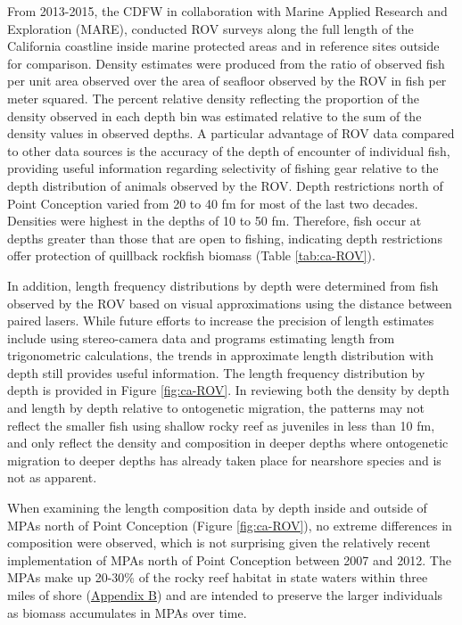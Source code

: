 \documentclass[11pt,
  english,
  a4paper,
]{article}
\begin{document}
From 2013-2015, the CDFW in collaboration with Marine Applied Research and Exploration (MARE), conducted ROV surveys along the full length of the California coastline inside marine protected areas and in reference sites outside for comparison. Density estimates were produced from the ratio of observed fish per unit area observed over the area of seafloor observed by the ROV in fish per meter squared. The percent relative density reflecting the proportion of the density observed in each depth bin was estimated relative to the sum of the density values in observed depths. A particular advantage of ROV data compared to other data sources is the accuracy of the depth of encounter of individual fish, providing useful information regarding selectivity of fishing gear relative to the depth distribution of animals observed by the ROV. Depth restrictions north of Point Conception varied from 20 to 40 fm for most of the last two decades. Densities were highest in the depths of 10 to 50 fm. Therefore, fish occur at depths greater than those that are open to fishing, indicating depth restrictions offer protection of quillback rockfish biomass (Table \ref{tab:ca-ROV}).

\leavevmode\tagmcend\tagstructend\par


In addition, length frequency distributions by depth were determined from fish observed by the ROV based on visual approximations using the distance between paired lasers. While future efforts to increase the precision of length estimates include using stereo-camera data and programs estimating length from trigonometric calculations, the trends in approximate length distribution with depth still provides useful information. The length frequency distribution by depth is provided in Figure \ref{fig:ca-ROV}. In reviewing both the density by depth and length by depth relative to ontogenetic migration, the patterns may not reflect the smaller fish using shallow rocky reef as juveniles in less than 10 fm, and only reflect the density and composition in deeper depths where ontogenetic migration to deeper depths has already taken place for nearshore species and is not as apparent.

\leavevmode\tagmcend\tagstructend\par


When examining the length composition data by depth inside and outside of MPAs north of Point Conception (Figure \ref{fig:ca-ROV}), no extreme differences in composition were observed, which is not surprising given the relatively recent implementation of MPAs north of Point Conception between 2007 and 2012. The MPAs make up 20-30\% of the rocky reef habitat in state waters within three miles of shore ({\protect\hyperlink{append_b}{Appendix B}\leavevmode\tagmcend\tagstructend}) and are intended to preserve the larger individuals as biomass accumulates in MPAs over time.
\end{document}

